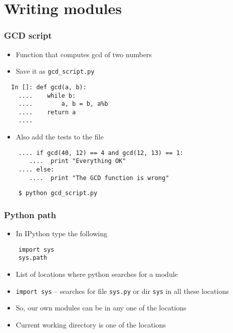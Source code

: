 \section{Writing modules}

\begin{frame}[fragile]
  \frametitle{GCD script}
  \begin{itemize}
  \item Function that computes gcd of two numbers
  \item Save it as \texttt{gcd\_script.py}
  \end{itemize}
  \begin{lstlisting}
  In []: def gcd(a, b):
    ....    while b:
    ....        a, b = b, a%b
    ....    return a
    ....
  \end{lstlisting}
  \begin{itemize}
  \item Also add the tests to the file
  \end{itemize}
  \begin{lstlisting}
    .... if gcd(40, 12) == 4 and gcd(12, 13) == 1:
       ....  print "Everything OK"
    .... else:
       ....  print "The GCD function is wrong"
  \end{lstlisting}
  \begin{lstlisting}
    $ python gcd_script.py
  \end{lstlisting} %
\end{frame}

\begin{frame}[fragile]
  \frametitle{Python path}
  \begin{itemize}
  \item In IPython type the following
  \end{itemize}
  \begin{lstlisting}
    import sys
    sys.path
  \end{lstlisting}
  \begin{itemize}
  \item List of locations where python searches for a module
  \item \texttt{import sys} -- searches for file \texttt{sys.py} or
    dir \texttt{sys} in all these locations
  \item So, our own modules can be in any one of the locations
  \item Current working directory is one of the locations
  \end{itemize}
\end{frame}


